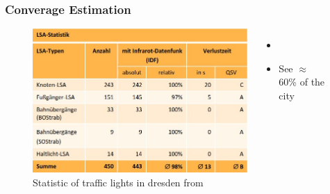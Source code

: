 \begin{frame}
\frametitle{Converage Estimation}

\begin{figure}
\begin{columns}
\begin{center}
  \includegraphics[height=0.6\textheight]{figs/urbic_stops_dresden.jpg}
  \caption{Statistic of traffic lights in dresden from }
\end{center}
\raggedright
\vspace{0.5cm}

\begin{itemize}
  \item {}
  \item See $\approx$ 60\% of the city
\end{itemize}

\end{columns}
\end{figure}

\end{frame}


